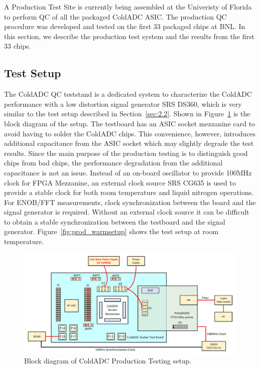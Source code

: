 \label{sec:6}


A Production Test Site is currently being assembled at the Univeristy of Florida to perform QC of all the packaged ColdADC ASIC.  The production QC procedure was developed and tested on the first 33 packaged chips at BNL. In this section, we describe the production test system and the results from the first 33 chips.

\subsection{Test Setup}
\label{sec:6.1}
The ColdADC QC teststand is a dedicated system to characterize the ColdADC performance with a low distortion 
signal generator SRS DS360, which is very similar to the test setup described in Section~\ref{sec:2.2}.  
Shown in Figure~\ref{fig:prodQC_blockdiagram} is the block diagram of the setup. The testboard has an ASIC 
socket mezzanine card to avoid having to solder the ColdADC chips. 
This convenience, however, introduces additional capacitance from the ASIC socket which may slightly degrade the test results.
Since the main purpose of the production testing is to distinguish good chips from bad chips, the performance degradation 
from the additional capacitance is not an issue. 
Instead of an on-board oscillator to provide 100MHz clock for FPGA Mezzanine, an external clock source SRS CG635 is used to provide a 
stable clock for both room temperature and liquid nitrogen operations. For ENOB/FFT measurements, clock synchronization between the 
board and the signal generator is required.  Without an external clock source it can be difficult to obtain a stable synchronization 
between the testboard and the signal generator. 
Figure~\ref{fig:prod_warmsetup} shows the test setup at room temperature.
\begin{figure}[h!]
\centering
  \includegraphics[width=0.8\linewidth]{figures/prodQC_blockdiagram.png}
  \caption{Block diagram of ColdADC Production Testing setup.}
  \label{fig:prodQC_blockdiagram}
\end{figure}
